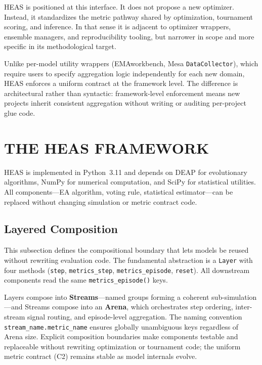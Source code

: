 \documentclass{wscpaperproc}
\begin{document}
HEAS is positioned at this interface. It does not propose a new optimizer.
Instead, it standardizes the metric pathway shared by optimization, tournament
scoring, and inference. In that sense it is adjacent to optimizer wrappers,
ensemble managers, and reproducibility tooling, but narrower in scope and more
specific in its methodological target.

Unlike per-model utility wrappers (EMAworkbench, Mesa \texttt{DataCollector}), which require users to specify aggregation logic independently for each new domain, HEAS enforces a uniform contract at the framework level. The difference is architectural rather than syntactic: framework-level enforcement means new projects inherit consistent aggregation without writing or auditing per-project glue code.

\section{THE HEAS FRAMEWORK}

HEAS is implemented in Python~3.11 and depends on DEAP for evolutionary
algorithms, NumPy for numerical computation, and SciPy for statistical
utilities. All components---EA algorithm, voting rule, statistical
estimator---can be replaced without changing simulation or metric contract code.

\subsection{Layered Composition}

This subsection defines the compositional boundary that lets models be reused
without rewriting evaluation code. The fundamental abstraction is a
\texttt{Layer} with four methods
(\texttt{step}, \texttt{metrics\_step}, \texttt{metrics\_episode},
\texttt{reset}). All downstream components read the same
\texttt{metrics\_episode()} keys.

Layers compose into \textbf{Streams}---named groups forming a coherent
sub-simulation---and Streams compose into an \textbf{Arena}, which orchestrates
step ordering, inter-stream signal routing, and episode-level aggregation. The
naming convention \texttt{stream\_name.metric\_name} ensures globally unambiguous
keys regardless of Arena size. Explicit composition boundaries make components
testable and replaceable without rewriting optimization or tournament code;
the uniform metric contract (C2) remains stable as model internals evolve.
\end{document}
